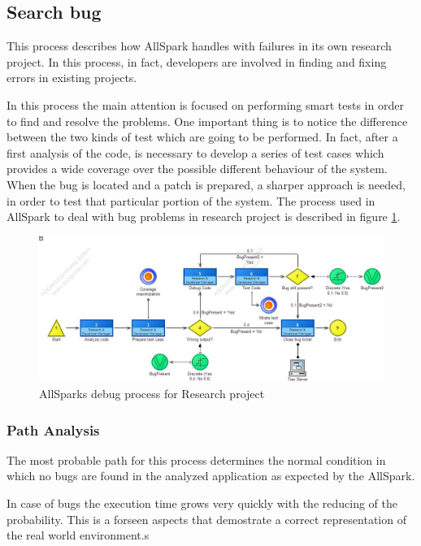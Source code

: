 \subsection{Search bug}
This process describes how AllSpark handles with failures in its own
research project. In this process, in fact, developers are involved in
finding and fixing errors in existing projects.

In this process the main attention is focused on performing smart tests in
order to find and resolve the problems. One important thing is to notice
the difference between the two kinds of test which are going to be
performed.
In fact, after a first analysis of the code, is necessary to develop a
series of test cases which provides a wide coverage over the possible
different behaviour of the system. When the bug is located and a patch is
prepared, a sharper approach is needed, in order to test that particular
portion of the system. The process used in AllSpark to deal with bug
problems in research project is described in figure \ref{2img:search_bug}.

\begin{figure}[!ht]
\begin{centering}
\includegraphics[scale=0.50, angle=90]{assign2/adonis/imgs/debug.jpg}
\caption{AllSparks debug process for Research project}
\label{2img:search_bug}
\end{centering}
\end{figure}

\subsubsection{Path Analysis}
The most probable path for this process determines the normal condition in
which no bugs are found in the analyzed application as expected by the AllSpark.

In case of bugs the execution time grows very quickly with the reducing of the probability. This is a forseen aspects that demostrate a correct representation of the real world environment.s


